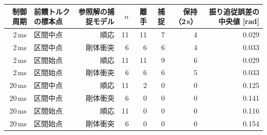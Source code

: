 \begin{tabular}{rlrrrrrr}
\toprule
制御周期 & 前饋トルクの標本点 & 参照解の捕捉モデル & $n$ & 離手 & 捕捉 & 保持（2\,s） & 振り追従誤差の中央値 [rad] \\
\midrule
2\,ms & 区間中点 & 順応 & 11 & 11 & 7 & 4 & 0.029 \\
2\,ms & 区間中点 & 剛体衝突 & 6 & 6 & 6 & 4 & 0.033 \\
2\,ms & 区間始点 & 順応 & 11 & 11 & 9 & 6 & 0.029 \\
2\,ms & 区間始点 & 剛体衝突 & 6 & 6 & 6 & 5 & 0.033 \\
20\,ms & 区間中点 & 順応 & 11 & 2 & 0 & 0 & 0.125 \\
20\,ms & 区間中点 & 剛体衝突 & 6 & 0 & 0 & 0 & 0.141 \\
20\,ms & 区間始点 & 順応 & 11 & 0 & 0 & 0 & 0.116 \\
20\,ms & 区間始点 & 剛体衝突 & 6 & 0 & 0 & 0 & 0.154 \\
\bottomrule
\end{tabular}
